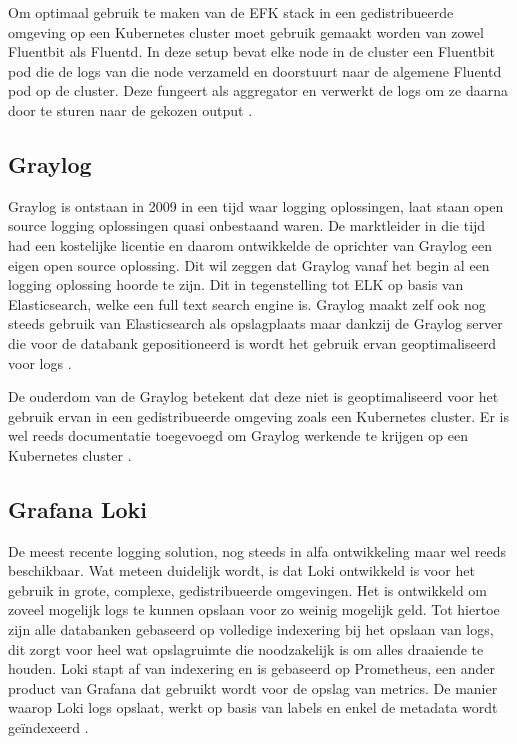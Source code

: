 Om optimaal gebruik te maken van de EFK stack in een gedistribueerde omgeving op een Kubernetes cluster moet gebruik gemaakt worden van zowel Fluentbit als Fluentd. In deze setup bevat elke node in de cluster een Fluentbit pod die de logs van die node verzameld en doorstuurt naar de algemene Fluentd pod op de cluster. Deze fungeert als aggregator en verwerkt de logs om ze daarna door te sturen naar de gekozen output \autocite{berman2018-06}.

\subsection{Graylog}
\label{subsec:graylog}
Graylog is ontstaan in 2009 in een tijd waar logging oplossingen, laat staan open source logging oplossingen quasi onbestaand waren. De marktleider in die tijd had een kostelijke licentie en daarom ontwikkelde de oprichter van Graylog een eigen open source oplossing. Dit wil zeggen dat Graylog vanaf het begin al een logging oplossing hoorde te zijn. Dit in tegenstelling tot ELK op basis van Elasticsearch, welke een full text search engine is. Graylog maakt zelf ook nog steeds gebruik van Elasticsearch als opslagplaats maar dankzij de Graylog server die voor de databank gepositioneerd is wordt het gebruik ervan geoptimaliseerd voor logs \autocite{graylog}.

De ouderdom van de Graylog betekent dat deze niet is geoptimaliseerd voor het gebruik ervan in een gedistribueerde omgeving zoals een Kubernetes cluster. Er is wel reeds documentatie toegevoegd om Graylog werkende te krijgen op een Kubernetes cluster \autocite{lumiq2017}.  

\subsection{Grafana Loki}
De meest recente logging solution, nog steeds in alfa ontwikkeling maar wel reeds beschikbaar. Wat meteen duidelijk wordt, is dat Loki ontwikkeld is voor het gebruik in grote, complexe, gedistribueerde omgevingen. Het is ontwikkeld om zoveel mogelijk logs te kunnen opslaan voor zo weinig mogelijk geld. Tot hiertoe zijn alle databanken gebaseerd op volledige indexering bij het opslaan van logs, dit zorgt voor heel wat opslagruimte die noodzakelijk is om alles draaiende te houden. Loki stapt af van indexering en is gebaseerd op Prometheus, een ander product van Grafana dat gebruikt wordt voor de opslag van metrics. De manier waarop Loki logs opslaat, werkt op basis van labels en enkel de metadata wordt geïndexeerd \autocite{oleksii2019}.

